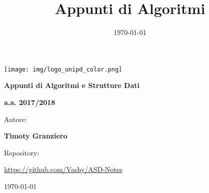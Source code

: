 \documentclass[12pt,a4paper]{article}
\author{\authorName}
\date{\today}
\title{Appunti di Algoritmi}
\newcommand{\authorName}{Timoty Granziero}
\begin{document}
\begin{titlepage}
	\centering
	\texttt{[image: img/logo\_unipd\_color.png]}\par\vspace{1cm} %
	
	{\LARGE\bfseries Appunti di Algoritmi e Strutture Dati \par}
	\vspace{1cm}
	
	{\Large\bfseries a.a. 2017/2018 \par}
	
	\vspace{1cm} 

	Autore: \par
	{\bfseries \authorName \par}
	
	\vspace{1cm}

	Repository: \par
	\url{https://github.com/Vashy/ASD-Notes}
    
    \vfill
	
	{\large \today\par}
	
\end{titlepage}

\newpage
\tableofcontents

\frenchspacing

\newpage

 \newpage
 
 \newpage



\end{document}
